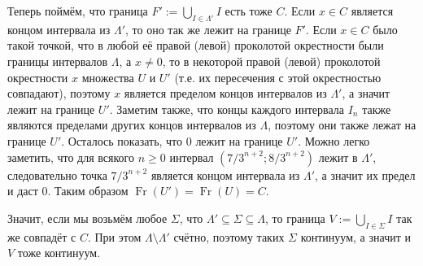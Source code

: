 \documentclass[12pt,a4paper]{article}
\DeclareMathOperator{\Fr}{Fr}
\begin{document}
\begin{problem}{31}
        Теперь поймём, что граница $F' := \bigcup_{I \in \Lambda'} I$ есть тоже $C$. Если $x \in C$ является концом интервала из $\Lambda'$, то оно так же лежит на границе $F'$. Если $x \in C$ было такой точкой, что в любой её правой (левой) проколотой окрестности были границы интервалов $\Lambda$, а $x \neq 0$, то в некоторой правой (левой) проколотой окрестности $x$ множества $U$ и $U'$ (т.е. их пересечения с этой окрестностью совпадают), поэтому $x$ является пределом концов интервалов из $\Lambda'$, а значит лежит на границе $U'$. Заметим также, что концы каждого интервала $I_n$ также являются пределами других концов интервалов из $\Lambda$, поэтому они также лежат на границе $U'$. Осталось показать, что $0$ лежит на границе $U'$. Можно легко заметить, что для всякого $n \geqslant 0$ интервал $(7/3^{n + 2}; 8/3^{n+2})$ лежит в $\Lambda'$, следовательно точка $7/3^{n+2}$ является концом интервала из $\Lambda'$, а значит их предел и даст $0$. Таким образом $\Fr(U') = \Fr(U) = C$.

        Значит, если мы возьмём любое $\Sigma$, что $\Lambda' \subseteq \Sigma \subseteq \Lambda$, то граница $V := \bigcup_{I \in \Sigma} I$ так же совпадёт с $C$. При этом $\Lambda \setminus \Lambda'$ счётно, поэтому таких $\Sigma$ континуум, а значит и $V$ тоже континуум.
    \end{problem}
\end{document}
